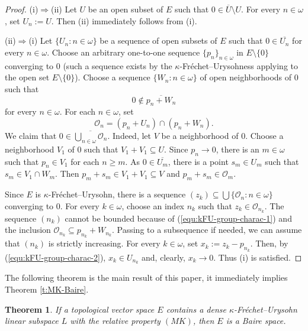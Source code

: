 \documentclass[preprint,11pt]{elsarticle}
\newtheorem{theorem}{Theorem}[section]
\theoremstyle{definition}
\theoremstyle{remark}
\numberwithin{equation}{section}
\numberwithin{theorem}{section}
\newcommand{\w}{\omega}
\newcommand{\Ra}{\Rightarrow}
\newcommand{\SM}{{\setminus}}
\begin{document}
\begin{proof}
(i)$\Ra$(ii) Let $U$ be an open subset of $E$ such that $0\in \overline{U}\SM U$. For every $n\in\w$, set $U_n:=U$. Then (ii) immediately follows from (i).
\smallskip

(ii)$\Ra$(i) Let $\{U_n: n\in \w\}$  be a sequence of open subsets of $E$ such that $0\in \overline{U_n}$ for every $n\in\w$. Choose an arbitrary one-to-one sequence $\{p_n\}_{n\in\w}$ in $E\SM \{0\}$  converging to $0$ (such a sequence exists by the $\kappa$-Fr\'{e}chet--Urysohness applying to the open set $E\SM\{0\}$).  Choose a sequence $\{W_n: n\in \w\}$ of open neighborhoods of $0$ such that
\begin{equation} \label{equ:kFU-group-charac-1}
0\not\in \overline{p_n +W_n}
\end{equation}
for every $n\in \w$. For each $n\in\w$, set
\begin{equation} \label{equ:kFU-group-charac-2}
\mathcal{O}_n=(p_n+U_n)\cap (p_n+W_n).
\end{equation}
We claim that $0\in \overline{\bigcup_{n\in\w} \mathcal{O}_n}$.  Indeed, let $V$ be a neighborhood of $0$. Choose a neighborhood $V_1$ of $0$ such that $V_1+ V_1\subseteq U$. Since $p_n\to 0$, there is an $m\in\w$ such that $p_n\in V_1$ for each $n\geq m$.  As $0\in \overline{U_m}$, there is a point $s_m\in U_m$ such that $s_m\in V_1\cap W_m$. Then $p_m+ s_m\in V_1+ V_1\subseteq V$ and $p_m+ s_m\in \mathcal{O}_m$.
\smallskip

Since $E$ is $\kappa$-Fr\'{e}chet--Urysohn, there is a sequence $(z_k)\subseteq \bigcup \{\mathcal{O}_n: n\in\w\}$ converging to $0$. For every $k\in\w$, choose an index $n_k$ such that $z_k\in \mathcal{O}_{n_k}$. The sequence $(n_k)$ cannot be bounded because of (\ref{equ:kFU-group-charac-1}) and the inclusion $\mathcal{O}_{n_k} \subseteq p_{n_k}+W_{n_k}$. Passing to a subsequence if needed, we can assume that $(n_k)$ is strictly increasing.  For every $k\in\w$, set $x_k:= z_k -p_{n_k} $. Then, by (\ref{equ:kFU-group-charac-2}), $x_k\in U_{n_k}$ and, clearly, $x_k\to 0$. Thus (i) is satisfied.
\end{proof}



The following theorem is the main result of this paper, it immediately implies Theorem \ref{t:MK-Baire}.


\begin{theorem} \label{t:kFU-MK-dense-Baire}
If a topological vector space $E$ contains a dense $\kappa$-Fr\'{e}chet--Urysohn linear subspace $L$ with the relative property $(MK)$, then $E$ is a Baire space.
\end{theorem}
\end{document}
